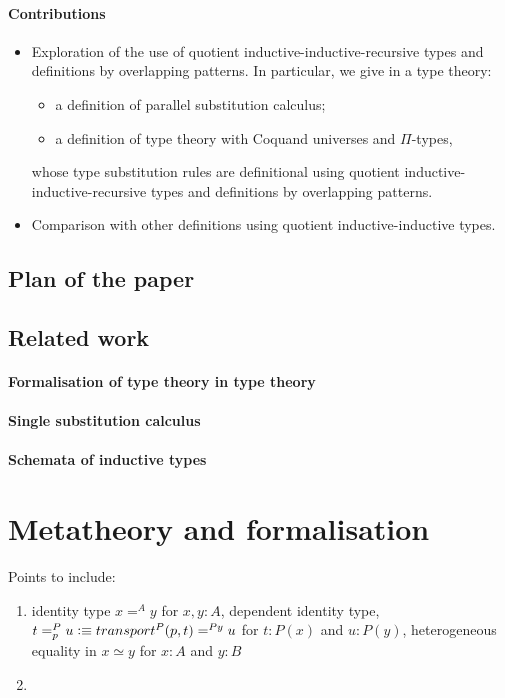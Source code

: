 \documentclass[a4paper,UKenglish,numberwithinsect,cleveref,thm-restate]{lipics-v2021}
\begin{document}
\paragraph*{Contributions}
\begin{itemize}
  \item Exploration of the use of quotient inductive-inductive-recursive types and definitions by overlapping patterns.
    In particular, we give in a type theory:
    \begin{itemize}
      \item a definition of parallel substitution calculus;
      \item a definition of type theory with Coquand universes and $\Pi$-types,
    \end{itemize}
   whose type substitution rules are definitional using quotient inductive-inductive-recursive types and definitions by overlapping patterns.
  \item Comparison with other definitions using quotient inductive-inductive types.
\end{itemize}


\subsection{Plan of the paper}
\subsection{Related work}
\paragraph*{Formalisation of type theory in type theory}
\cite{Danielsson2006,Altenkirch2016a}
\cite{Altenkirch2017}

\paragraph*{Single substitution calculus}
\cite{Kaposi2023,Kaposi2024a}
\paragraph*{Schemata of inductive types}
\cite{Kaposi2019}
\cite{Dybjer2003,Dybjer2000,Dybjer1999}

\section{Metatheory and formalisation}
\cite{Pujet2022,Pujet2024,Pujet2022a}
Points to include:
\begin{enumerate}
  \item identity type $x =^{A} y$ for $x, y : A$, dependent identity type, $t =^{P}_{p} u \defeq \transfib{P}{p}{t} =^{P y} u$ for $t : P(x)$ and $u : P(y)$, heterogeneous equality in \Agda $x \simeq y$ for $x : A$ and $y : B$
  \item 
\end{enumerate}
\end{document}
